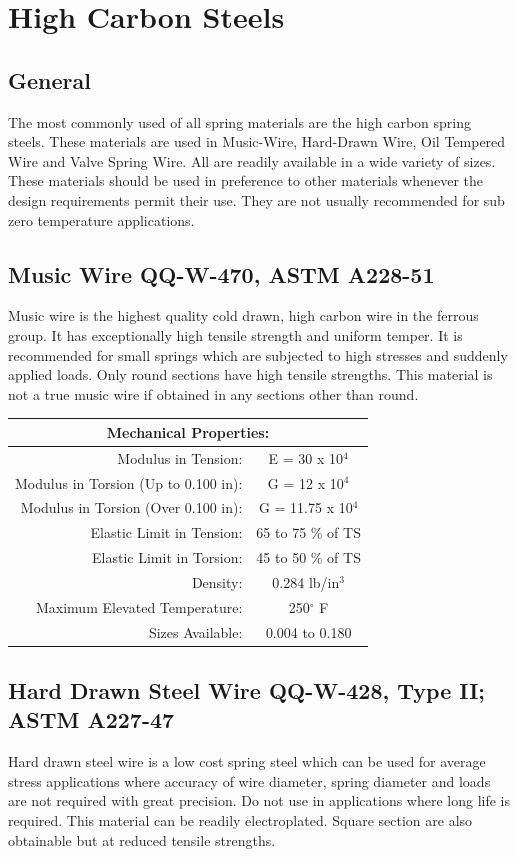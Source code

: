 \documentclass[10pt]{article}
\begin{document}
\section{High Carbon Steels} %
\subsection{General}
The most commonly used of all spring materials are the high carbon spring steels. 
These materials are used in Music-Wire, Hard-Drawn Wire, Oil Tempered Wire and Valve Spring Wire. 
All are readily available in a wide variety of sizes. 
These materials should be used in preference to other materials whenever the design requirements permit their use. 
They are not usually recommended for sub zero temperature applications.

\subsection{Music Wire QQ-W-470, ASTM A228-51} %
Music wire is the highest quality cold drawn, high carbon wire in the ferrous group.
It has exceptionally high tensile strength and uniform temper. 
It is recommended for small springs which are subjected to high stresses and suddenly applied loads.
Only round sections have high tensile strengths.
This material is not a true music wire if obtained in any sections other than round.

\begin{center}
\begin{tabular}{ r c }
\multicolumn{2}{c}{Mechanical Properties:} \\
\hline
Modulus in Tension: & E = 30 x 10$^4$ \\ 
Modulus in Torsion (Up to 0.100 in): & G = 12 x 10$^4$ \\  
Modulus in Torsion (Over 0.100 in): & G = 11.75 x 10$^4$ \\
Elastic Limit in Tension: & 65 to 75 \% of TS \\  
Elastic Limit in Torsion: & 45 to 50 \% of TS \\
Density: & 0.284 lb/in$^3$ \\
Maximum Elevated Temperature: & 250$^\circ$ F \\
Sizes Available: & 0.004 to 0.180 \\
\hline
\end{tabular}
\end{center}

\subsection{Hard Drawn Steel Wire QQ-W-428, Type II; ASTM A227-47} %
Hard drawn steel wire is a low cost spring steel which can be used for average stress applications where accuracy of wire diameter, spring diameter and loads are not required with great precision.
Do not use in applications where long life is required.
This material can be readily electroplated.
Square section are also obtainable but at reduced tensile strengths.
\end{document}
